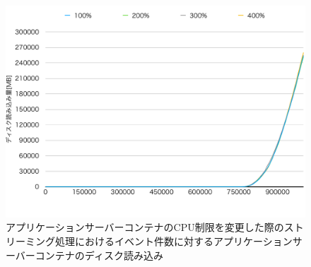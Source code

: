 \documentclass[../../../../../main]{subfiles}
\begin{document}
    \begin{figure}[H]
        \centering
        \includegraphics[width=12cm]{graph}
        \caption{アプリケーションサーバーコンテナのCPU制限を変更した際のストリーミング処理におけるイベント件数に対するアプリケーションサーバーコンテナのディスク読み込み}
        \label{fig:stream-change-app-cpu-limit-app-disk-out-app_1024-db_1_1024}
    \end{figure}
\end{document}

